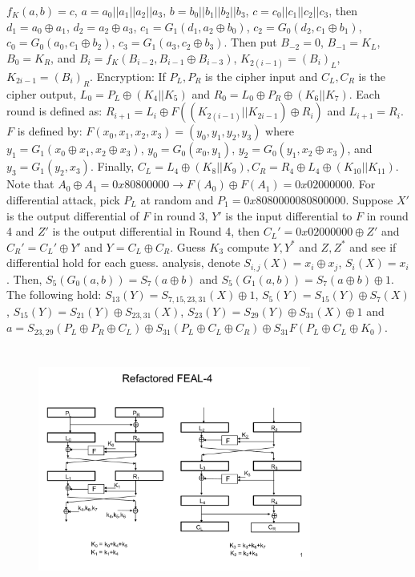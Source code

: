 $f_K(a,b)= c$, 
$a= a_0 || a_1 ||a_2 ||a_3$,
$b= b_0 || b_1 ||b_2 ||b_3$,
$c= c_0 || c_1 ||c_2 ||c_3$, then 
$d_1= a_0 \oplus a_1$,
$d_2= a_2 \oplus a_3$,
$c_1= G_1(d_1, a_2 \oplus b_0)$,
$c_2= G_0(d_2, c_1 \oplus b_1)$,
$c_0= G_0(a_0, c_1 \oplus b_2)$,
$c_3= G_1(a_3, c_2 \oplus b_3)$.  Then put 
$B_{-2}=0$,
$B_{-1}= K_L$,
$B_{0}= K_R$, and
$B_{i}= f_K(B_{i-2}, B_{i-1} \oplus B_{i-3})$, 
$K_{2(i-1)}= (B_i)_L$,
$K_{2i-1}= (B_i)_R$.
Encryption:
If $P_L, P_R$ is the cipher input and
$C_L, C_R$ is the cipher output, $L_0= P_L \oplus (K_4 || K_5)$ and
$R_0= L_0 \oplus P_R \oplus (K_6 || K_7)$.  Each round is defined as:
$R_{i+1}= L_i \oplus F((K_{2(i-1)} || K_{2i-1}) \oplus R_i)$ and
$L_{i+1}= R_i$.  $F$ is defined by:
$F(x_0, x_1, x_2, x_3) = (y_0, y_1, y_2, y_3)$ where
$y_1=G_1(x_0 \oplus x_1 , x_2 \oplus x_3)$,
$y_0=G_0(x_0, y_1)$,
$y_2=G_0(y_1, x_2 \oplus x_3)$, and
$y_3=G_1(y_2, x_3)$.  Finally, 
$C_L= L_4 \oplus (K_8 || K_9), C_R= R_4 \oplus L_4 \oplus (K_{10} || K_{11})$.  Note that
$A_0 \oplus A_1 = 0x80800000 \rightarrow F(A_0 ) \oplus F(A_1 ) = 0x02000000$.
For differential attack, pick $P_L$ at random and $P_1= 0x8080000080800000$.
Suppose $X'$ is the output differential of $F$ in round 3, $Y'$ is the input differential
to $F$ in round 4 and $Z'$ is the output differential in Round 4, then
$C_L'= 0x02000000 \oplus Z'$ and $C_R'= C_L' \oplus Y'$ and $Y=C_L \oplus C_R$.  Guess $K_3$
compute $Y, Y^*$ and $Z, Z^*$ and see if differential hold for each guess.
analysis, denote $S_{i,j}(X)= x_i \oplus x_j$, $S_i(X)= x_i$.  Then,
$S_5(G_0(a,b))= S_7(a \oplus b)$ and
$S_5(G_1(a,b))= S_7(a \oplus b) \oplus 1$.  The following hold:
$S_{13}(Y)= S_{7,15,23,31}(X) \oplus 1$,
$S_{5}(Y)= S_{15}(Y) \oplus S_{7}(X)$,
$S_{15}(Y)= S_{21}(Y) \oplus  S_{23, 31}(X)$,
$S_{23}(Y)= S_{29}(Y) \oplus S_{31}(X) \oplus 1$ and
$a= S_{23, 29}(P_L \oplus P_R  \oplus C_L) \oplus S_{31}(P_L \oplus C_L \oplus C_R)
\oplus S_{31}F(P_L \oplus C_L \oplus K_0)$.
\\
\begin{figure} 
\center
\includegraphics[width=0.8\textwidth,natwidth=642,natheight=610, height=80mm, width=88mm]{feal1.pdf}
\end{figure}
